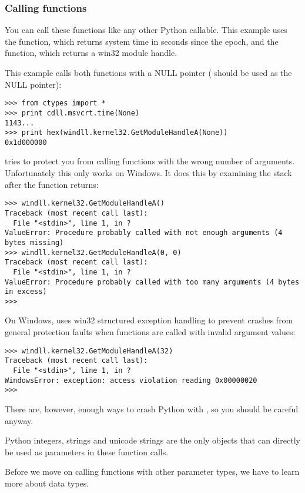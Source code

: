 \subsubsection{Calling functions\label{ctypes-calling-functions}}

You can call these functions like any other Python callable. This
example uses the  function, which returns system time in
seconds since the \UNIX{} epoch, and the  function,
which returns a win32 module handle.

This example calls both functions with a NULL pointer ( should
be used as the NULL pointer):
\begin{verbatim}
>>> from ctypes import *
>>> print cdll.msvcrt.time(None)
1143...
>>> print hex(windll.kernel32.GetModuleHandleA(None))
0x1d000000
\end{verbatim}

 tries to protect you from calling functions with the wrong
number of arguments.  Unfortunately this only works on Windows.  It
does this by examining the stack after the function returns:
\begin{verbatim}
>>> windll.kernel32.GetModuleHandleA()
Traceback (most recent call last):
  File "<stdin>", line 1, in ?
ValueError: Procedure probably called with not enough arguments (4 bytes missing)
>>> windll.kernel32.GetModuleHandleA(0, 0)
Traceback (most recent call last):
  File "<stdin>", line 1, in ?
ValueError: Procedure probably called with too many arguments (4 bytes in excess)
>>>
\end{verbatim}

On Windows,  uses win32 structured exception handling to
prevent crashes from general protection faults when functions are
called with invalid argument values:
\begin{verbatim}
>>> windll.kernel32.GetModuleHandleA(32)
Traceback (most recent call last):
  File "<stdin>", line 1, in ?
WindowsError: exception: access violation reading 0x00000020
>>>
\end{verbatim}

There are, however, enough ways to crash Python with , so
you should be careful anyway.

Python integers, strings and unicode strings are the only objects that
can directly be used as parameters in these function calls.

Before we move on calling functions with other parameter types, we
have to learn more about  data types.


